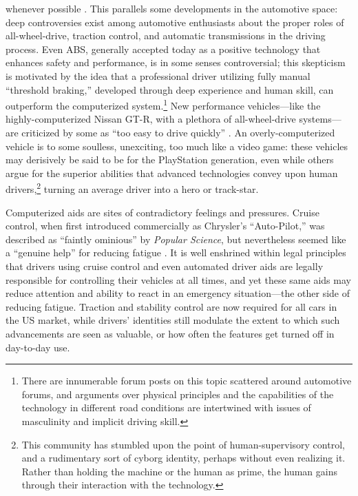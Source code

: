 whenever possible \cite[p. 38]{PARCCAST}. This parallels some developments
in the automotive space: deep controversies exist among automotive
enthusiasts about the proper roles of all-wheel-drive, traction
control, and automatic transmissions in the driving process. Even ABS,
generally accepted today as a positive technology that enhances safety and
performance, is in some senses controversial; this skepticism is
motivated by the idea that 
a professional driver utilizing fully manual ``threshold braking,''
developed through deep experience and human skill, can outperform the
computerized system.\footnote{There are innumerable forum posts on
  this topic scattered around automotive forums, and arguments over
  physical principles and the capabilities of the technology in
  different road conditions are
  intertwined with issues of masculinity and implicit driving skill.}
New performance vehicles---like the 
highly-computerized Nissan GT-R, with a plethora of all-wheel-drive
systems---are criticized by some as ``too easy to drive quickly'' \cite{edmunds}.
An overly-computerized vehicle is to some soulless, unexciting, too much like
a video game: these vehicles may derisively be said to be for the
PlayStation generation, even while others argue for the superior
abilities that advanced technologies convey upon human
drivers,\footnote{This community has stumbled upon the point of
  human-supervisory control, and a rudimentary sort of cyborg
  identity, perhaps without even realizing it. Rather than holding the
machine or the human as prime, the human gains through their
interaction with the technology.}
turning an average driver into a hero or track-star.


Computerized aids are sites of contradictory feelings and pressures.
Cruise control, when first introduced commercially as Chrysler's ``Auto-Pilot,''
was described as ``faintly
ominious'' by \emph{Popular Science}, but nevertheless seemed like a
``genuine help'' for reducing
fatigue \cite{rowsomePopsci}.
It is well enshrined within legal principles that drivers using
cruise control and even automated driver aids are legally responsible
for controlling their vehicles at all times, and yet these same aids
may reduce attention and ability to react in an emergency
situation---the other side of reducing fatigue.
Traction and stability control are now required for all cars in the US
market,\cite{brookingsLiability} while drivers' identities still modulate the
extent to which such
advancements are seen as valuable, or how often the features get
turned off in day-to-day use. 

